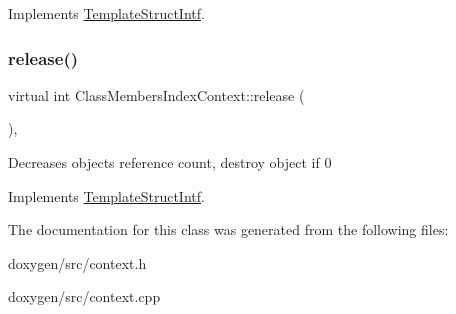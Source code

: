 Implements \mbox{\hyperlink{class_template_struct_intf_a3d610cb81b4adbb531ebed3aa3d09b51}{Template\+Struct\+Intf}}.

\mbox{\label{class_class_members_index_context_a8605031254937e99bc7874e0715ea7f2}} 
\subsubsection{\texorpdfstring{release()}{release()}}
{\footnotesize\ttfamily virtual int Class\+Members\+Index\+Context\+::release (\begin{DoxyParamCaption}{ }\end{DoxyParamCaption})\hspace{0.3cm}{\ttfamily [inline]}, {\ttfamily [virtual]}}

Decreases object\textquotesingle{}s reference count, destroy object if 0 

Implements \mbox{\hyperlink{class_template_struct_intf_a3dce7dd29d3f66a8080b40578e8a5045}{Template\+Struct\+Intf}}.



The documentation for this class was generated from the following files\+:\begin{DoxyCompactItemize}
\item 
doxygen/src/context.\+h\item 
doxygen/src/context.\+cpp\end{DoxyCompactItemize}
